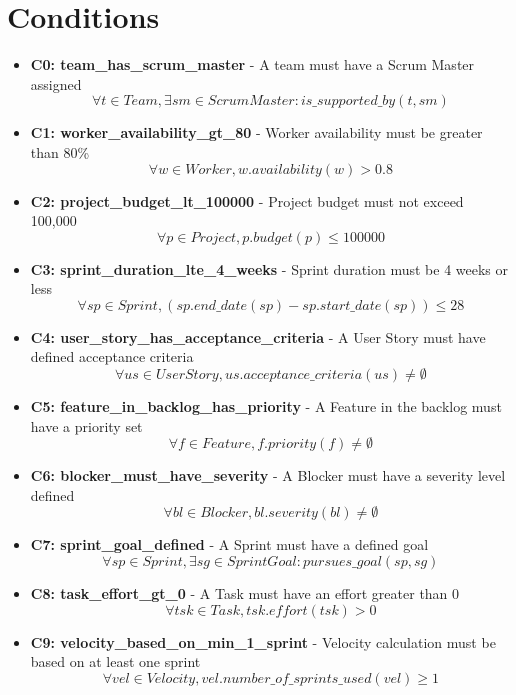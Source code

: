 \documentclass{article}
\begin{document}
\section{Conditions}
\begin{itemize}
    \item \textbf{C0: team\_has\_scrum\_master} - A team must have a Scrum Master assigned
        \[ \forall t \in Team, \exists sm \in ScrumMaster : is\_supported\_by(t, sm) \]
    \item \textbf{C1: worker\_availability\_gt\_80} - Worker availability must be greater than 80\%
        \[ \forall w \in Worker, w.availability(w) > 0.8 \]
    \item \textbf{C2: project\_budget\_lt\_100000} - Project budget must not exceed 100,000
        \[ \forall p \in Project, p.budget(p) \leq 100000 \]
    \item \textbf{C3: sprint\_duration\_lte\_4\_weeks} - Sprint duration must be 4 weeks or less
        \[ \forall sp \in Sprint, (sp.end\_date(sp) - sp.start\_date(sp)) \leq 28 \]
    \item \textbf{C4: user\_story\_has\_acceptance\_criteria} - A User Story must have defined acceptance criteria
        \[ \forall us \in UserStory, us.acceptance\_criteria(us) \neq \emptyset \]
    \item \textbf{C5: feature\_in\_backlog\_has\_priority} - A Feature in the backlog must have a priority set
        \[ \forall f \in Feature, f.priority(f) \neq \emptyset \]
    \item \textbf{C6: blocker\_must\_have\_severity} - A Blocker must have a severity level defined
        \[ \forall bl \in Blocker, bl.severity(bl) \neq \emptyset \]
    \item \textbf{C7: sprint\_goal\_defined} - A Sprint must have a defined goal
        \[ \forall sp \in Sprint, \exists sg \in SprintGoal : pursues\_goal(sp, sg) \]
    \item \textbf{C8: task\_effort\_gt\_0} - A Task must have an effort greater than 0
        \[ \forall tsk \in Task, tsk.effort(tsk) > 0 \]
    \item \textbf{C9: velocity\_based\_on\_min\_1\_sprint} - Velocity calculation must be based on at least one sprint
        \[ \forall vel \in Velocity, vel.number\_of\_sprints\_used(vel) \geq 1 \]
\end{itemize}
\end{document}
